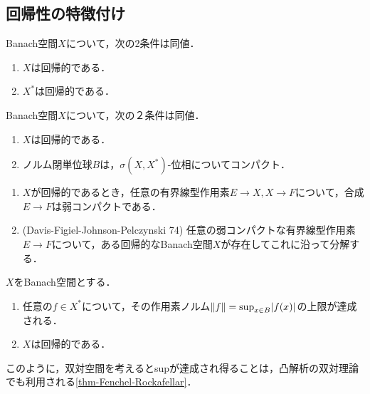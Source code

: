 \documentclass[uplatex,dvipdfmx]{jsreport}
\begin{document}
\subsection{回帰性の特徴付け}

\begin{proposition}
    Banach空間$X$について，次の2条件は同値．
    \begin{enumerate}
        \item $X$は回帰的である．
        \item $X^*$は回帰的である．
    \end{enumerate}
\end{proposition}

\begin{theorem}\label{thm-characterization-of-reflexive-Banach-spaces}
    Banach空間$X$について，次の２条件は同値．
    \begin{enumerate}
        \item $X$は回帰的である．
        \item ノルム閉単位球$B$は，$\sigma(X,X^*)$-位相についてコンパクト．
    \end{enumerate}
\end{theorem}

\begin{corollary}\mbox{}
    \begin{enumerate}
        \item $X$が回帰的であるとき，任意の有界線型作用素$E\to X,X\to F$について，合成$E\to F$は弱コンパクトである．
        \item (Davis-Figiel-Johnson-Pelczynski 74) 任意の弱コンパクトな有界線型作用素$E\to F$について，ある回帰的なBanach空間$X$が存在してこれに沿って分解する．
    \end{enumerate}
\end{corollary}

\begin{theorem}[James, R. C.]\label{thm-James}
    $X$をBanach空間とする．
    \begin{enumerate}
        \item 任意の$f\in X^*$について，その作用素ノルム$\|f\|=\sup_{x\in B}\lvert f(x)\rvert$の上限が達成される．
        \item $X$は回帰的である．
    \end{enumerate}
\end{theorem}
\begin{remarks}
    このように，双対空間を考えるとsupが達成され得ることは，凸解析の双対理論でも利用される\ref{thm-Fenchel-Rockafellar}．
\end{remarks}
\end{document}
